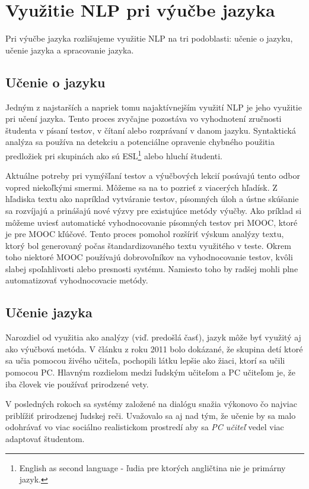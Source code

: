 \documentclass[10pt,slovak,a4paper,twoside]{article}
\begin{document}
\section{Využitie NLP pri výučbe jazyka}\label{vyuzitie_jazyka_nlp}
Pri výučbe jazyka rozlišujeme využitie NLP na tri podoblasti: učenie o jazyku, učenie jazyka a spracovanie jazyka.
\subsection{Učenie o jazyku} \label{ucenie_o_jazyku}
		Jedným z najstarších a napriek tomu najaktívnejším využití NLP je jeho využitie pri učení jazyka.
	Tento proces zvyčajne pozostáva vo vyhodnotení zručnosti študenta v písaní testov, v čítaní alebo
	rozprávaní v danom jazyku. Syntaktická analýza sa používa na detekciu a potenciálne opravenie chybného použitia
	predložiek pri skupinách ako sú ESL\footnote{English as second language - ľudia pre ktorých angličtina nie je primárny jazyk.} alebo hluchí študenti.

	Aktuálne potreby pri vymýšľaní testov a výučbových lekcií posúvajú tento odbor vopred niekoľkými smermi. Môžeme sa na to pozrieť z viacerých hľadísk. 
	Z hľadiska textu ako napríklad vytváranie testov, písomných úloh a ústne skúšanie sa rozvíjajú a prinášajú nové výzvy pre existujúce metódy výučby.
	Ako príklad si môžeme uviesť automatické vyhodnocovanie písomných testov pri MOOC, ktoré je pre MOOC kľúčové. Tento proces pomohol rozšíriť výskum analýzy textu, 
	ktorý bol generovaný počas štandardizovaného textu využitého v teste. Okrem toho niektoré MOOC používajú dobrovoľníkov na vyhodnocovanie testov, 
	kvôli slabej spoľahlivosti alebo presnosti systému. Namiesto toho by radšej mohli plne automatizovať vyhodnocovacie metódy.\cite{litman2016natural}
\subsection{Učenie jazyka} \label{ucenie_pomocou_nlp}
	Narozdiel od využitia ako analýzy (viď. predošlá časť), jazyk môže byť využitý aj ako výučbová metóda.
	V článku z roku 2011\cite{clanok_o_studovani} bolo dokázané, že skupina detí ktoré sa učia pomocou živého učiteľa, 
	pochopili látku lepšie ako žiaci, ktorí sa učili pomocou PC. Hlavným rozdielom medzi ľudským učiteľom a PC učiteľom 
	je, že iba človek vie používať prirodzené vety.

	V posledných rokoch sa systémy založené na dialógu snažia výkonovo čo najviac priblížiť prirodzenej ľudskej reči. 
	Uvažovalo sa aj nad tým, že učenie by sa malo odohrávať vo viac sociálno realistickom prostredí aby sa \textit{PC učiteľ} vedel viac adaptovať študentom.
\end{document}
